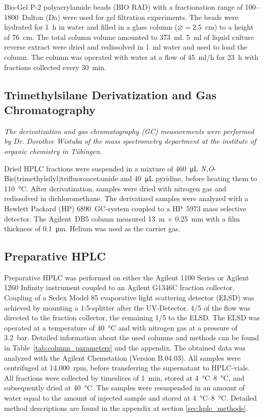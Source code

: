 Bio-Gel P-2 polyacrylamide beads (BIO RAD) with a fractionation range of 100--1800~Dalton (Da) were used for gel filtration experiments.
The beads were hydrated for 1~h in water and filled in a glass column ($\varnothing=2.5$~cm) to a height of 76~cm.
The total column volume amounted to 373~ml.
5~ml of liquid culture reverse extract were dried and redissolved in 1~ml water and used to load the column.
The column was operated with water at a flow of 45~ml/h for 23~h with fractions collected every 30~min.


\subsection{Trimethylsilane Derivatization and Gas Chromatography} %
\label{sub:trimethylsilane_derivatization_and_gas_chromatography}

\emph{The derivatization and gas chromatography (GC) measurements were performed by Dr. Dorothee Wistuba of the mass spectrometry department at the institute of organic chemistry in Tübingen.}

Dried HPLC fractions were suspended in a mixture of \SI{460}{\micro\liter} \emph{N,O}-Bis(trimethylsilyl)\-trifluoro\-acetamide and \SI{40}{\micro\liter} pyridine, before heating them to \SI{110}{\celsius}. After derivatization, samples were dried with nitrogen gas and redissolved in dichloromethane.
The derivatized samples were analyzed with a Hewlett Packard (HP) 6890~GC-system coupled to a HP~5973 mass selective detector. The Agilent~DB5 column measured 13~m $\times$ 0.25~mm with a film thickness of \SI{0.1}{\micro\meter}.
Helium was used as the carrier gas.

\subsection{Preparative HPLC} %
\label{sub:preparative_hplc}

Preparative HPLC was performed on either the Agilent 1100 Series or Agilent 1260 Infinity instrument coupled to an Agilent G1346C fraction collector.
Coupling of a Sedex Model 85 evaporative light scattering detector (ELSD) was achieved by mounting a 1:5-splitter after the UV-Detector.
4/5 of the flow was directed to the fraction collector, the remaining 1/5 to the ELSD.
The ELSD was operated at a temperature of \SI{40}{\celsius} and with nitrogen gas at a pressure of \SI{3.2}{\bar}.
Detailed information about the used columns and methods can be found in Table~\ref{tab:column_parameters} and the appendix.
The obtained data was analyzed with the Agilent Chemstation (Version B.04.03).
All samples were centrifuged at 14,000~rpm, before transferring the supernatant to HPLC-vials.
All fractions were collected by timeslices of \SI{1}{\minute}, stored at \SIrange{4}{8}{\celsius}, and subsequently dried at \SI{40}{\celsius}.
The samples were resuspended in an amount of water equal to the amount of injected sample and stored at \SIrange{4}{8}{\celsius}.
Detailed method descriptions are found in the appendix at section \ref{sec:hplc_methods}.

